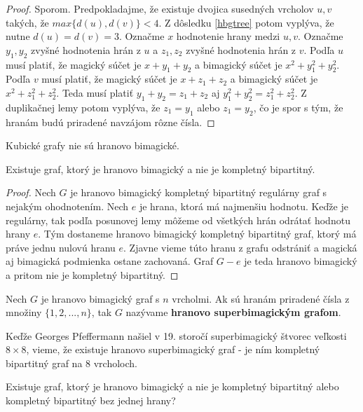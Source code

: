 \begin{proof} Sporom. Predpokladajme, že existuje dvojica susedných vrcholov $u,v$ takých, že $max \{d(u), d(v)\} < 4$. Z dôsledku \ref{hbgtree}  potom vyplýva, že nutne $d(u) = d(v) = 3$. Označme $x$ hodnotenie hrany medzi $u,v$. Označme $y_1, y_2$ zvyšné hodnotenia hrán z $u$ a $z_1, z_2$ zvyšné hodnotenia hrán z $v$. Podľa $u$ musí platiť, že magický súčet je $x + y_1 + y_2$ a bimagický súčet je $x^2 + y^2_1 + y^2_2$. Podľa $v$ musí platiť, že magický súčet je $x + z_1 + z_2$ a bimagický súčet je $x^2 + z^2_1 + z^2_2$. Teda musí platiť $y_1 + y_2 = z_1 + z_2$ aj $y^2_1 + y^2_2 = z^2_1 + z^2_2$. Z duplikačnej lemy potom vyplýva, že $z_1 = y_1$ alebo $z_1 = y_2$, čo je spor s tým, že hranám budú priradené navzájom rôzne čísla.
\end{proof} 

\begin{consequence} Kubické grafy nie sú hranovo bimagické.
\end{consequence}

\begin{theorem} Existuje graf, ktorý je hranovo bimagický a nie je kompletný bipartitný.
\end{theorem}

\begin{proof} Nech $G$ je hranovo bimagický kompletný bipartitný regulárny graf s nejakým ohodnotením. Nech $e$ je hrana, ktorá má najmenšiu hodnotu. Keďže je regulárny, tak podľa posunovej lemy môžeme od všetkých hrán odrátať hodnotu hrany $e$. Tým dostaneme hranovo bimagický kompletný bipartitný graf, ktorý má práve jednu nulovú hranu $e$. Zjavne vieme túto hranu z grafu odstrániť a magická aj bimagická podmienka ostane zachovaná. Graf $G - e$ je teda hranovo bimagický a pritom nie je kompletný bipartitný.
\end{proof}

\begin{definition} Nech $G$ je hranovo bimagický graf s $n$ vrcholmi. Ak sú hranám priradené čísla z množiny $\{1, 2, ... , n\}$, tak $G$ nazývame \textbf{hranovo superbimagickým grafom}.
\end{definition} 

Keďže Georges Pfeffermann našiel v 19. storočí superbimagický štvorec veľkosti $8 \times 8$, vieme, že existuje hranovo superbimagický graf - je ním kompletný bipartitný graf na $8$ vrcholoch.

\begin{hypothesis} Existuje graf, ktorý je hranovo bimagický a nie je kompletný bipartitný alebo kompletný bipartitný bez jednej hrany?
\end{hypothesis} 



